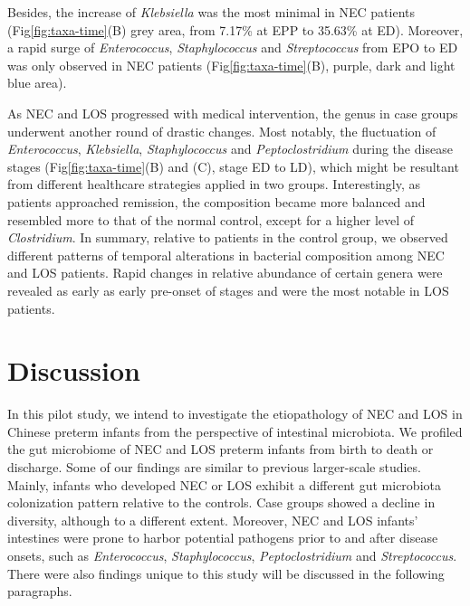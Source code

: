 \documentclass[fleqn,10pt]{wlpeerj} %
\begin{document}
    Besides, the increase of \textit{Klebsiella} was the most minimal in NEC patients (Fig\ref{fig:taxa-time}(B) grey area, from 7.17\% at EPP to 35.63\% at ED).  Moreover, a rapid surge of \textit{Enterococcus}, \textit{Staphylococcus} and \textit{Streptococcus} from EPO to ED was only observed in NEC patients (Fig\ref{fig:taxa-time}(B), purple, dark and light blue area).

  	As NEC and LOS progressed with medical intervention, the genus in case groups underwent another round of drastic changes.  Most notably, the fluctuation of \textit{Enterococcus}, \textit{Klebsiella}, \textit{Staphylococcus} and \textit{Peptoclostridium} during the disease stages (Fig\ref{fig:taxa-time}(B) and (C), stage ED to LD), which might be resultant from different healthcare strategies applied in two groups. Interestingly, as patients approached remission, the composition became more balanced and resembled more to that of the normal control, except for a higher level of \textit{Clostridium}.  In summary, relative to patients in the control group, we observed different patterns of temporal alterations in bacterial composition among NEC and LOS patients. Rapid changes in relative abundance of certain genera were revealed as early as early pre-onset of stages and were the most notable in LOS patients.


\section*{Discussion}
In this pilot study, we intend to investigate the etiopathology of NEC and LOS in Chinese preterm infants from the perspective of intestinal microbiota. We profiled the gut microbiome of NEC and LOS preterm infants from birth to death or discharge. Some of our findings are similar to previous larger-scale studies.  Mainly, infants who developed NEC or LOS exhibit a different gut microbiota colonization pattern relative to the controls. Case groups showed a decline in diversity, although to a different extent. Moreover, NEC and LOS infants' intestines were prone to harbor potential pathogens prior to and after disease onsets, such as \textit{Enterococcus}, \textit{Staphylococcus}, \textit{Peptoclostridium} and \textit{Streptococcus}. There were also findings unique to this study will be discussed in the following paragraphs.
\end{document}
